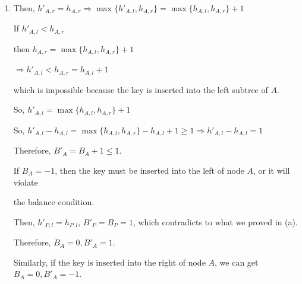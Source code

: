 \documentclass[12pt,a4paper]{article}
\makeatletter
\newtheorem*{solution}{Solution}
\theoremstyle{definition}
\renewenvironment{solution}[1][Solution] {\par\pushQED{\qed}\normalfont\topsep6\p@\@plus6\p@\relax\trivlist\item[\hskip\labelsep\bfseries#1\@addpunct{.}]\ignorespaces}{\popQED\endtrivlist\@endpefalse} \makeatother
\makeatother
\begin{document}
\begin{enumerate}
\begin{solution}
\begin{enumerate}
		\qquad Then, $h'_{A,r} = h_{A,r} \Rightarrow \max\{ h'_{A,l}, h_{A,r}\}  = \max\{ h_{A,l}, h_{A,r}\}  + 1$
		
		\qquad If  $h'_{A,l} <  h_{A,r}$
		
		\qquad \qquad then $h_{A,r} = \max\{ h_{A,l}, h_{A,r}\} + 1$ 
		
		\qquad \qquad $\Rightarrow h'_{A,l} < h_{A,r} = h_{A,l} + 1$
		
		\qquad \qquad which is impossible because  the key is inserted into the left subtree of $A$.
				
		\qquad So,   $h'_{A,l} = \max\{ h_{A,l}, h_{A,r}\} + 1$
		
		\qquad So, $h'_{A,l} - h_{A,l} = \max\{ h_{A,l}, h_{A,r}\} - h_{A,l} + 1 \geq 1 \Rightarrow h'_{A,l} - h_{A,l} = 1$ 
		
		\qquad Therefore, $B'_A = B_A + 1 \leq 1$. 
		
		\qquad If $B_A = -1$, then the key must be inserted into the left of node $A$, or it will violate 
		
		\qquad the balance condition.
		
		\qquad Then, $h'_{P,l} =h_{P,l}$, $B'_P = B_P = 1$, which contradicts to what we proved in (a).
		
		\qquad Therefore, $B_A = 0, B'_A = 1$.
		
		Similarly, if the key is inserted into the right  of node $A$, we can  get  $B_A = 0, B'_A = -1$.
		\end{enumerate}
	\end{solution}

\end{enumerate}

\end{document}
